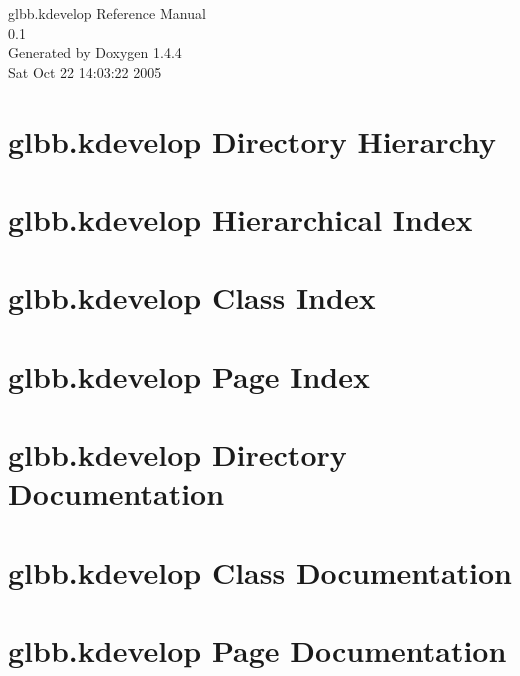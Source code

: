 \documentclass[a4paper]{book}
\begin{document}
\begin{titlepage}
\vspace*{7cm}
\begin{center}
{\Large glbb.kdevelop Reference Manual\\[1ex]\large 0.1 }\\
\vspace*{1cm}
{\large Generated by Doxygen 1.4.4}\\
\vspace*{0.5cm}
{\small Sat Oct 22 14:03:22 2005}\\
\end{center}
\end{titlepage}
\clearemptydoublepage
{}
\tableofcontents
\clearemptydoublepage
{}
\chapter{glbb.kdevelop Directory Hierarchy}

\chapter{glbb.kdevelop Hierarchical Index}

\chapter{glbb.kdevelop Class Index}

\chapter{glbb.kdevelop Page Index}

\chapter{glbb.kdevelop Directory Documentation}


\chapter{glbb.kdevelop Class Documentation}






























\chapter{glbb.kdevelop Page Documentation}

\printindex
\end{document}
